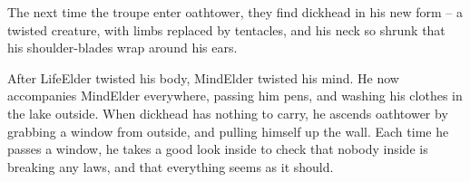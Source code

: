 \begin{multicols}{2}
The next time the troupe enter \gls{oathtower}, they find \gls{dickhead} in his new form -- a twisted creature, with limbs replaced by tentacles, and his neck so shrunk that his shoulder-blades wrap around his ears.

After \gls{LifeElder} twisted his body, \gls{MindElder} twisted his mind.
He now accompanies \gls{MindElder} everywhere, passing him pens, and washing his clothes in the lake outside.
When \gls{dickhead} has nothing to carry, he ascends \gls{oathtower} by grabbing a window from outside, and pulling himself up the wall.
Each time he passes a window, he takes a good look inside to check that nobody inside is breaking any laws, and that everything seems as it should.


\dickheadReborn


\end{multicols}
